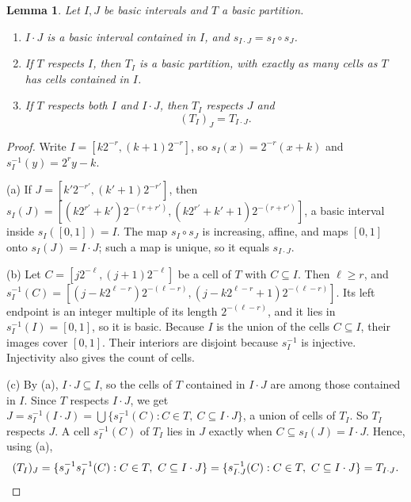 \documentclass[11pt]{article}
\newtheorem{lemma}[theorem]{Lemma}
\theoremstyle{definition}
\numberwithin{equation}{section}
\begin{document}
\begin{lemma}\label{dyad:restr}
Let \(I,J\) be basic intervals and \(T\) a basic partition.
\begin{enumerate}[label=(\alph*)]
\item \(I\cdot J\) is a basic interval contained in \(I\), and
\(s_{I\cdot J}=s_I\circ s_J\).
\item If \(T\) respects \(I\), then \(T_I\) is a basic partition, with
exactly as many cells as \(T\) has cells contained in \(I\).
\item If \(T\) respects both \(I\) and \(I\cdot J\), then \(T_I\) respects
\(J\) and
\begin{equation}\label{dyad:restriction}
  (T_I)_J=T_{I\cdot J}.
\end{equation}
\end{enumerate}
\end{lemma}

\begin{proof}
Write \(I=[k2^{-r},(k+1)2^{-r}]\), so \(s_I(x)=2^{-r}(x+k)\) and
\(s_I^{-1}(y)=2^ry-k\).

(a) If \(J=[k'2^{-r'},(k'+1)2^{-r'}]\), then
\(s_I(J)=[(k2^{r'}+k')2^{-(r+r')},(k2^{r'}+k'+1)2^{-(r+r')}]\), a basic
interval inside \(s_I([0,1])=I\). The map \(s_I\circ s_J\) is increasing,
affine, and maps \([0,1]\) onto \(s_I(J)=I\cdot J\); such a map is unique,
so it equals \(s_{I\cdot J}\).

(b) Let \(C=[j2^{-\ell},(j+1)2^{-\ell}]\) be a cell of \(T\) with
\(C\subseteq I\). Then \(\ell\ge r\), and
\(s_I^{-1}(C)=[(j-k2^{\ell-r})2^{-(\ell-r)},(j-k2^{\ell-r}+1)2^{-(\ell-r)}]\).
Its left endpoint is an integer multiple of its length \(2^{-(\ell-r)}\), and
it lies in \(s_I^{-1}(I)=[0,1]\), so it is basic. Because \(I\) is the union
of the cells \(C\subseteq I\), their images cover \([0,1]\). Their interiors
are disjoint because \(s_I^{-1}\) is injective. Injectivity also gives the
count of cells.

(c) By (a), \(I\cdot J\subseteq I\), so the cells of \(T\) contained in
\(I\cdot J\) are among those contained in \(I\). Since \(T\) respects
\(I\cdot J\), we get
\(J=s_I^{-1}(I\cdot J)=\bigcup\{s_I^{-1}(C):C\in T,\ C\subseteq I\cdot J\}\),
a union of cells of \(T_I\). So \(T_I\) respects \(J\). A cell
\(s_I^{-1}(C)\) of \(T_I\) lies in \(J\) exactly when \(C\subseteq
s_I(J)=I\cdot J\). Hence, using (a),
\[
 (T_I)_J=\{s_J^{-1}s_I^{-1}(C):C\in T,\ C\subseteq I\cdot J\}
        =\{s_{I\cdot J}^{-1}(C):C\in T,\ C\subseteq I\cdot J\}
        =T_{I\cdot J}.\qedhere
\]
\end{proof}
\end{document}
